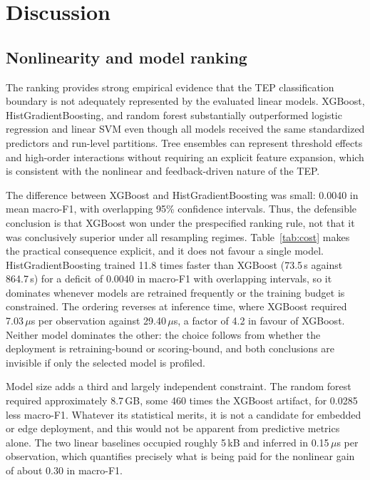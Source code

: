 \documentclass[12pt,a4paper]{article}
\begin{document}
\section{Discussion}

\subsection{Nonlinearity and model ranking}
\label{sec:nonlinearity}

The ranking provides strong empirical evidence that the TEP classification
boundary is not adequately represented by the evaluated linear models.
XGBoost, HistGradientBoosting, and random forest substantially outperformed
logistic regression and linear SVM even though all models received the same
standardized predictors and run-level partitions. Tree ensembles can represent
threshold effects and high-order interactions without requiring an explicit
feature expansion, which is consistent with the nonlinear and feedback-driven
nature of the TEP.

The difference between XGBoost and HistGradientBoosting was small: 0.0040 in
mean macro-F1, with overlapping 95\% confidence intervals. Thus, the defensible
conclusion is that XGBoost won under the prespecified ranking rule, not that it
was conclusively superior under all resampling regimes. Table~\ref{tab:cost}
makes the practical consequence explicit, and it does not favour a single
model. HistGradientBoosting trained 11.8 times faster than XGBoost (73.5\,s
against 864.7\,s) for a deficit of 0.0040 in macro-F1 with overlapping
intervals, so it dominates whenever models are retrained frequently or the
training budget is constrained. The ordering reverses at inference time, where
XGBoost required 7.03\,$\mu$s per observation against 29.40\,$\mu$s, a factor of
4.2 in favour of XGBoost. Neither model dominates the other: the choice follows
from whether the deployment is retraining-bound or scoring-bound, and both
conclusions are invisible if only the selected model is profiled.

Model size adds a third and largely independent constraint. The random forest
required approximately 8.7\,GB, some 460 times the XGBoost artifact, for
0.0285 less macro-F1. Whatever its statistical merits, it is not a candidate
for embedded or edge deployment, and this would not be apparent from predictive
metrics alone. The two linear baselines occupied roughly 5\,kB and inferred in
0.15\,$\mu$s per observation, which quantifies precisely what is being paid for
the nonlinear gain of about 0.30 in macro-F1.
\end{document}
